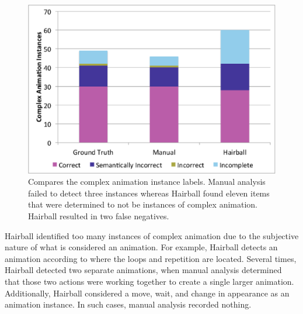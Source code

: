 \begin{figure}[!t]
\centering \includegraphics[trim=.3in .15in .3in .15in, clip,
  width=5.25in]{graphs/AutoAnimation.eps}
\caption{Compares the complex animation instance labels. Manual analysis failed
  to detect three instances whereas Hairball found eleven items that were
  determined to not be instances of complex animation. Hairball resulted in two
  false negatives.}
\end{figure}

Hairball identified too many instances of complex animation due to the
subjective nature of what is considered an animation.  For example, Hairball
detects an animation according to where the loops and repetition are
located. Several times, Hairball detected two separate animations, when manual
analysis determined that those two actions were working together to create a
single larger animation. Additionally, Hairball considered a move, wait, and
change in appearance as an \incom{} animation instance. In such cases, manual
analysis recorded nothing.

